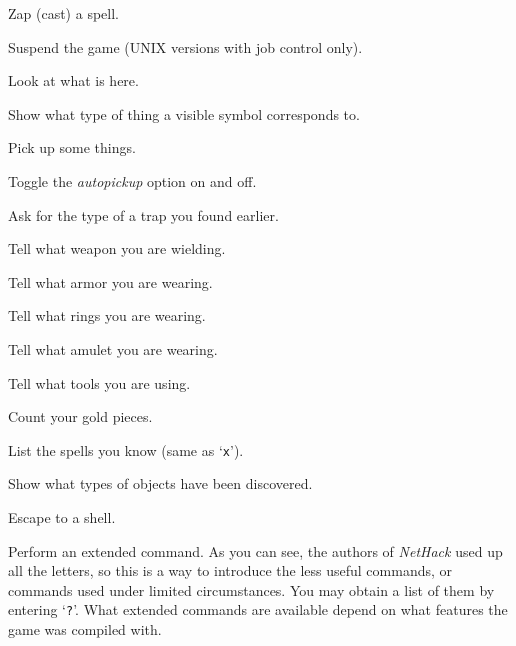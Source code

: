 Zap (cast) a spell.
\item[\tb{\^{}Z}]
Suspend the game (UNIX versions with job control only).
\item[\tb{:}]
Look at what is here.
\item[\tb{;}]
Show what type of thing a visible symbol corresponds to.
\item[\tb{,}]
Pick up some things.
\item[\tb{@}]
Toggle the {\it autopickup\/} option on and off.
\item[\tb{\^{}}]
Ask for the type of a trap you found earlier.
\item[\tb{)}]
Tell what weapon you are wielding.
\item[\tb{[}]
Tell what armor you are wearing.
\item[\tb{=}]
Tell what rings you are wearing.
\item[\tb{"}]
Tell what amulet you are wearing.
\item[\tb{(}]
Tell what tools you are using.
\item[\tb{\$}]
Count your gold pieces.
\item[\tb{+}]
List the spells you know (same as `{\tt x}').
\item[\tb{$\backslash$}]
Show what types of objects have been discovered.
\item[\tb{!}]
Escape to a shell.
\item[\tb{\#}]
Perform an extended command.  As you can see, the authors of {\it NetHack\/}
used up all the letters, so this is a way to introduce the less useful
commands, or commands used under limited circumstances.  You may obtain a
list of them by entering `{\tt ?}'.  What extended commands are available
depend on what features the game was compiled with.
\elist

